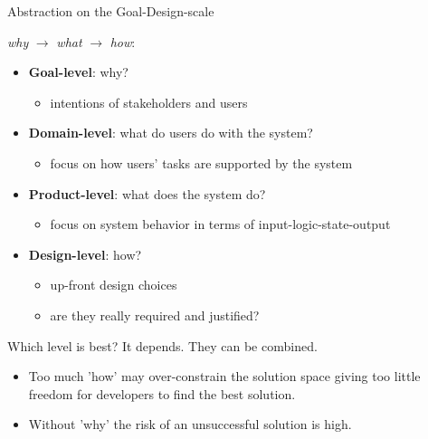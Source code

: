 \begin{Slide}{Abstraction on the Goal-Design-scale}

\textit{why} $\rightarrow$ \textit{what} $\rightarrow$  \textit{how}:
\begin{itemize}
\item \textbf{Goal-level}: why? 
\begin{itemize}
\item intentions of stakeholders and users
\end{itemize}
\item \textbf{Domain-level}: what do users do with the system?
\begin{itemize}
\item focus on how users' tasks are supported by the system
\end{itemize}
\item \textbf{Product-level}: what does the system do?
\begin{itemize}
\item focus on system behavior in terms of input-logic-state-output
\end{itemize}
\item \textbf{Design-level}: how? 
\begin{itemize}
\item up-front design choices
\item are they really required and justified?  

\end{itemize}
\end{itemize}
Which level is best? It depends. They can be combined.
\begin{itemize}
\item Too much 'how' may over-constrain the solution space giving too little freedom for developers to find the best solution.  
\item Without 'why' the risk of an unsuccessful solution is high.

\end{itemize}
\end{Slide}